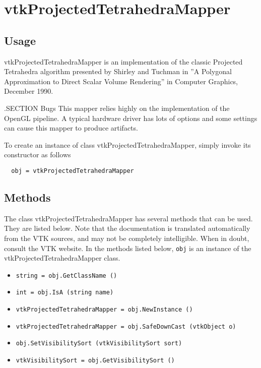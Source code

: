 \section{vtkProjectedTetrahedraMapper}

\subsection{Usage}

 vtkProjectedTetrahedraMapper is an implementation of the classic
 Projected Tetrahedra algorithm presented by Shirley and Tuchman in ''A
 Polygonal Approximation to Direct Scalar Volume Rendering'' in Computer
 Graphics, December 1990.

 .SECTION Bugs
 This mapper relies highly on the implementation of the OpenGL pipeline.
 A typical hardware driver has lots of options and some settings can
 cause this mapper to produce artifacts.


To create an instance of class vtkProjectedTetrahedraMapper, simply
invoke its constructor as follows
\begin{verbatim}
  obj = vtkProjectedTetrahedraMapper
\end{verbatim}
\subsection{Methods}

The class vtkProjectedTetrahedraMapper has several methods that can be used.
  They are listed below.
Note that the documentation is translated automatically from the VTK sources,
and may not be completely intelligible.  When in doubt, consult the VTK website.
In the methods listed below, \verb|obj| is an instance of the vtkProjectedTetrahedraMapper class.
\begin{itemize}
\item  \verb|string = obj.GetClassName ()|

\item  \verb|int = obj.IsA (string name)|

\item  \verb|vtkProjectedTetrahedraMapper = obj.NewInstance ()|

\item  \verb|vtkProjectedTetrahedraMapper = obj.SafeDownCast (vtkObject o)|

\item  \verb|obj.SetVisibilitySort (vtkVisibilitySort sort)|

\item  \verb|vtkVisibilitySort = obj.GetVisibilitySort ()|

\end{itemize}
